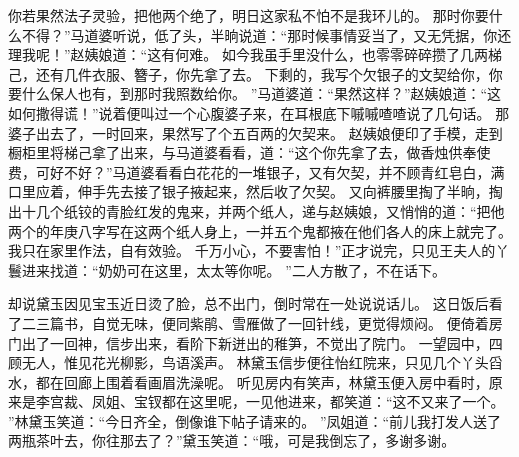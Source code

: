 你若果然法子灵验，把他两个绝了，明日这家私不怕不是我环儿的。
那时你要什么不得？”马道婆听说，低了头，半晌说道：“那时候事情妥当了，又无凭据，你还理我呢！”赵姨娘道：“这有何难。
如今我虽手里没什么，也零零碎碎攒了几两梯己，还有几件衣服、簪子，你先拿了去。
下剩的，我写个欠银子的文契给你，你要什么保人也有，到那时我照数给你。
”马道婆道：“果然这样？”赵姨娘道：“这如何撒得谎！”说着便叫过一个心腹婆子来，在耳根底下嘁嘁喳喳说了几句话。
那婆子出去了，一时回来，果然写了个五百两的欠契来。
赵姨娘便印了手模，走到橱柜里将梯己拿了出来，与马道婆看看，道：“这个你先拿了去，做香烛供奉使费，可好不好？”马道婆看看白花花的一堆银子，又有欠契，并不顾青红皂白，满口里应着，伸手先去接了银子掖起来，然后收了欠契。
又向裤腰里掏了半晌，掏出十几个纸铰的青脸红发的鬼来，并两个纸人，递与赵姨娘，又悄悄的道：“把他两个的年庚八字写在这两个纸人身上，一并五个鬼都掖在他们各人的床上就完了。
我只在家里作法，自有效验。
千万小心，不要害怕！”正才说完，只见王夫人的丫鬟进来找道：“奶奶可在这里，太太等你呢。
”二人方散了，不在话下。
\par
却说黛玉因见宝玉近日烫了脸，总不出门，倒时常在一处说说话儿。
这日饭后看了二三篇书，自觉无味，便同紫鹃、雪雁做了一回针线，更觉得烦闷。
便倚着房门出了一回神，信步出来，看阶下新迸出的稚笋，不觉出了院门。
一望园中，四顾无人，惟见花光柳影，鸟语溪声。
林黛玉信步便往怡红院来，只见几个丫头舀水，都在回廊上围着看画眉洗澡呢。
听见房内有笑声，林黛玉便入房中看时，原来是李宫裁、凤姐、宝钗都在这里呢，一见他进来，都笑道：“这不又来了一个。
”林黛玉笑道：“今日齐全，倒像谁下帖子请来的。
”凤姐道：“前儿我打发人送了两瓶茶叶去，你往那去了？”黛玉笑道：“哦，可是我倒忘了，多谢多谢。

